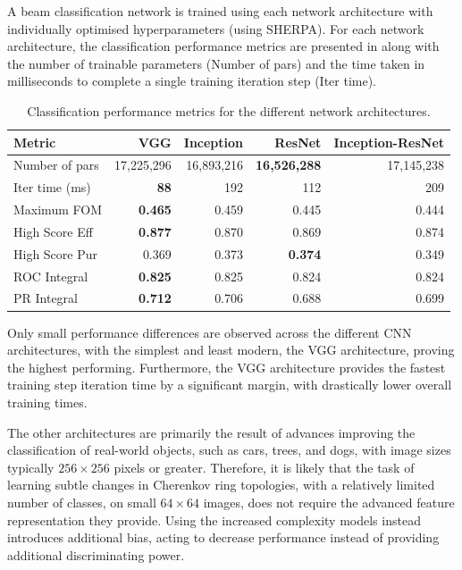 A beam classification network is trained using each network architecture with individually
optimised hyperparameters (using SHERPA). For each network architecture, the classification
performance metrics are presented in  along with the number of trainable
parameters (Number of pars) and the time taken in milliseconds to complete a single training
iteration step (Iter time).

\begin{table} %
    \begin{tabular}{lrrrr}
        Metric         & VGG            & Inception  & ResNet              & Inception-ResNet \\
        \midrule
        Number of pars & 17,225,296     & 16,893,216 & \textbf{16,526,288} & 17,145,238       \\
        Iter time (ms) & \textbf{88}    & 192        & 112                 & 209              \\
        Maximum FOM    & \textbf{0.465} & 0.459      & 0.445               & 0.444            \\
        High Score Eff & \textbf{0.877} & 0.870      & 0.869               & 0.874            \\
        High Score Pur & 0.369          & 0.373      & \textbf{0.374}      & 0.349            \\
        ROC Integral   & \textbf{0.825} & 0.825      & 0.824               & 0.824            \\
        PR Integral    & \textbf{0.712} & 0.706      & 0.688               & 0.699            \\
    \end{tabular}
    \caption[Classification performance metrics for different network architectures]
    {Classification performance metrics for the different network architectures.}
    \label{tab:sample}
\end{table}

Only small performance differences are observed across the different CNN architectures, with the
simplest and least modern, the VGG architecture, proving the highest performing. Furthermore, the
VGG architecture provides the fastest training step iteration time by a significant margin, with
drastically lower overall training times.

The other architectures are primarily the result of advances improving the classification of
real-world objects, such as cars, trees, and dogs, with image sizes typically $256\times256$
pixels or greater. Therefore, it is likely that the task of learning subtle changes in Cherenkov
ring topologies, with a relatively limited number of classes, on small $64\times64$ images, does
not require the advanced feature representation they provide. Using the increased complexity
models instead introduces additional bias, acting to decrease performance instead of providing
additional discriminating power.